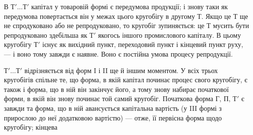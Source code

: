 В $Т'\dots{} Т'$ капітал у товаровій формі є передумова продукції; і знову таки як передумова повертається
він у межах цього кругобігу в другому Т. Якщо це Т ще не спродуковано або не репродуковано, то
кругобіг зупиняється: це Т мусить бути репродуковано здебільша як $Т'$ якогось іншого промислового
капіталу. В цьому кругобігу $Т'$ існує як вихідний пункт, переходовий пункт і кінцевий пункт руху, — і
воно тому завжди є наявне. Воно є постійна умова процесу репродукції.

$Т'\dots{} Т'$ відрізняється від форм I і II ще й іншим моментом. У всіх трьох кругобігів спільне те, що
форма, в якій капітал починає процес свого кругобігу, є також і форма, що в ній він закінчує його, а
тому знову набирає початкової форми, в якій він знову починає той самий кругобіг. Початкова форма Г,
П, $Т'$ є завжди та форма, що в ній авансується капітальна вартість (у III формі з прирослою до неї
додатковою вартістю) — отже, її первісна форма щодо кругобігу; кінцева
\parbreak{}  %
